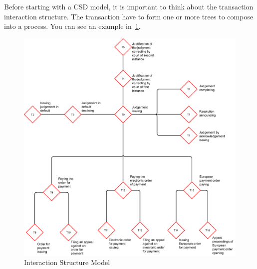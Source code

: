 Before starting with a CSD model, it is important to think about the transaction interaction structure. The transaction have to form one or more trees to compose into a process. You can see an example in~\cref{fig:interactionStructure}. 

\begin{landscape}

\begin{figure}[h]\centering
	\includegraphics[width=22cm]{pic/tree}
	\caption{Interaction Structure Model}
	\label{fig:interactionStructure}
\end{figure}

\end{landscape}

